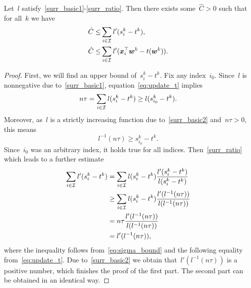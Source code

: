 \begin{lemma}\label{lemma:bound_zero}
  Let~$l$ satisfy~\ref{surr_basic1}-\ref{surr_ratio}. Then there exists some~$\hat{C} > 0$ such that for all~$k$ we have
  \begin{equation*}
    \begin{aligned}
      \hat{C} \leq & \sum_{i \in \mathcal{I}} l'(s_i^k - t^k), \\
      \hat{C} \leq & \sum_{i \in \mathcal{I}} l'(\bm{x}_i^\top \bm{w}^k - t(\bm{w}^k)).
    \end{aligned}
  \end{equation*}
\end{lemma}
\begin{proof}
  First, we will find an upper bound of~$s_i^k-t^k$. Fix any index~$i_0$. Since~$l$ is nonnegative due to~\ref{surr_basic1}, equation~\eqref{eq:update_t} implies
  \begin{equation*}
    n\tau = \sum_{i \in \mathcal{I}} l(s_i^k - t^k) \geq l(s_{i_0}^k - t^k).
  \end{equation*}
  Moreover, as~$l$ is a strictly increasing function due to~\ref{surr_basic2} and~$n\tau>0$, this means 
  \begin{equation}\label{eq:sigma_bound}
    l^{-1}(n\tau) \geq s_{i_0}^k-t^k.
  \end{equation}
  Since~$i_0$ was an arbitrary index, it holds true for all indices. Then~\ref{surr_ratio} which leads to a further estimate
  \begin{equation*}
    \begin{aligned}
    \sum_{i \in \mathcal{I}} l'(s_i^k - t^k)
      & = \sum_{i\in \mathcal{I}} l(s_i^k-t^k) \frac{l'(s_i^k-t^k)}{l(s_i^k-t^k)} \\
      & \geq \sum_{i \in \mathcal{I}} l(s_i^k - t^k) \frac{l'(l^{-1}(n\tau))}{l(l^{-1}(n\tau))} \\
      & = n\tau \frac{l'(l^{-1}(n\tau))}{l(l^{-1}(n\tau))} \\
      & = l'(l^{-1}(n\tau)),
    \end{aligned}
  \end{equation*}
  where the inequality follows from~\eqref{eq:sigma_bound} and the following equality from~\eqref{eq:update_t}. Due to~\ref{surr_basic2} we obtain that~$l'(l^{-1}(n\tau))$ is a positive number, which finishes the proof of the first part. The second part can be obtained in an identical way.
\end{proof}

\pagebreak


